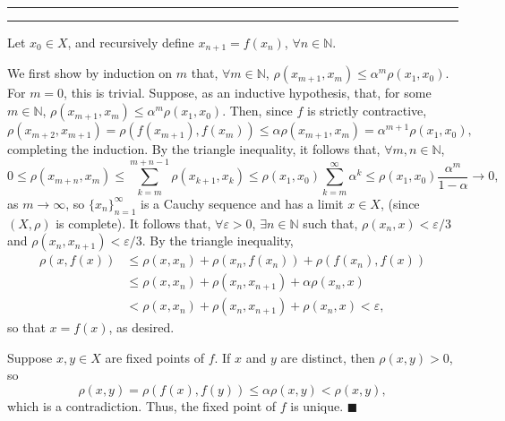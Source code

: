 \documentclass[11pt]{article}
\newcounter{questionCounter}
\newcounter{partCounter}[questionCounter]
\newenvironment{question}[2][\arabic{questionCounter}]{%
    \setcounter{partCounter}{0}%
    \vspace{.25in} \hrule \vspace{0.5em}%
        \noindent{\bf #2}%
    \vspace{0.8em} \hrule \vspace{.10in}%
    \addtocounter{questionCounter}{1}%
}{}
\renewcommand{\qed}{\quad $\blacksquare$}
\newcommand{\N}{\mathbb{N}} %
\newcommand{\e}{\varepsilon} %
\begin{document}
\begin{question}{Problem 8}
Let $x_0 \in X$, and recursively define $x_{n + 1} = f(x_n)$, $\forall n \in
\N$.

We first show by induction on $m$ that, $\forall m \in \N$,
$\rho(x_{m + 1}, x_m) \leq \alpha^m \rho(x_1,x_0)$. For $m = 0$, this is
trivial. Suppose, as an inductive hypothesis, that, for some $m \in \N$,
$\rho(x_{m + 1}, x_m) \leq \alpha^m \rho(x_1,x_0)$. Then, since $f$ is strictly
contractive,
\[\rho(x_{m + 2}, x_{m + 1})
 = \rho(f(x_{m + 1}), f(x_m))
 \leq \alpha \rho(x_{m + 1}, x_m)
 = \alpha^{m + 1} \rho(x_1,x_0),
\]
completing the induction. By the triangle inequality, it follows that,
$\forall m, n \in \N$,
\[0
 \leq \rho(x_{m + n}, x_m)
 \leq \sum_{k = m}^{m + n - 1} \rho(x_{k + 1}, x_k)
 \leq \rho(x_1, x_0) \sum_{k = m}^{\infty} \alpha^k
 \leq \rho(x_1, x_0) \frac{\alpha^m}{1 - \alpha}
 \rightarrow 0,
\]
as $m \rightarrow \infty$, so $\{x_n\}_{n = 1}^{\infty}$ is a Cauchy sequence
and has a limit $x \in X$, (since $(X, \rho)$ is complete). It follows that,
$\forall \e > 0$, $\exists n \in \N$ such that, $\rho(x_n,x) < \e/3$ and
$\rho(x_n,x_{n + 1}) < \e/3$. By the triangle inequality,
\begin{align*}
\rho(x,f(x))
 & \leq \rho(x,x_n) + \rho(x_n,f(x_n)) + \rho(f(x_n),f(x)) \\
 & \leq \rho(x,x_n) + \rho(x_n,x_{n + 1}) + \alpha\rho(x_n,x) \\
 & <    \rho(x,x_n) + \rho(x_n,x_{n + 1}) + \rho(x_n,x)
   < \e,
\end{align*}
so that $x = f(x)$, as desired.

Suppose $x,y \in X$ are fixed points of $f$. If $x$ and $y$ are distinct, then
$\rho(x,y) > 0$, so
\[\rho(x,y)
 = \rho(f(x),f(y))
 \leq \alpha \rho(x,y)
 < \rho(x,y),
\]
which is a contradiction. Thus, the fixed point of $f$ is unique. \qed
\end{question}
\end{document}
